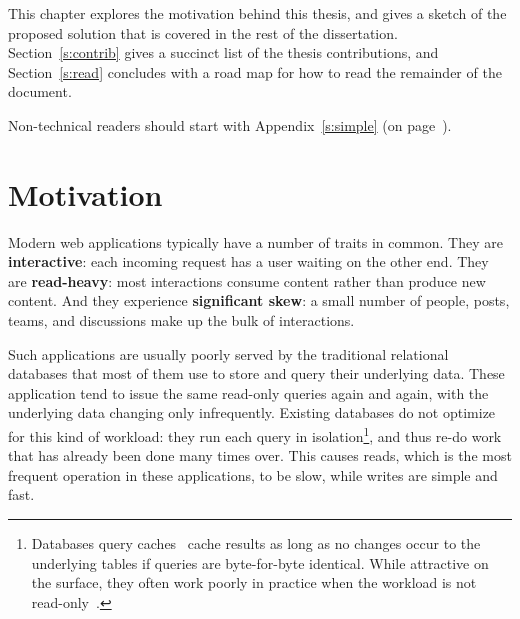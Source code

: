 This chapter explores the motivation behind this thesis, and gives a sketch of
the proposed solution that is covered in the rest of the dissertation.
Section~\ref{s:contrib} gives a succinct list of the thesis contributions, and
Section~\ref{s:read} concludes with a road map for how to read the remainder of
the document.

Non-technical readers should start with Appendix~\ref{s:simple} (on
page~\pageref{s:simple}).

\section{Motivation}

Modern web applications typically have a number of traits in common. They are
\textbf{interactive}: each incoming request has a user waiting on the other end.
They are \textbf{read-heavy}: most interactions consume content rather than
produce new content. And they experience \textbf{significant skew}: a small
number of people, posts, teams, and discussions make up the bulk of
interactions.

Such applications are usually poorly served by the traditional relational
databases that most of them use to store and query their underlying data. These
application tend to issue the same read-only queries again and again, with the
underlying data changing only infrequently. Existing databases do not optimize
for this kind of workload: they run each query in isolation\footnote{
Databases query caches~\cite{mysql-query-cache,pgpool-query-cache} cache results
as long as no changes occur to the underlying tables if queries are
byte-for-byte identical. While attractive on the surface, they often work poorly
in practice when the workload is not
read-only~\cite{mysql-query-cache-nope,pgpool-query-cache}.}, and thus re-do
work that has already been done many times over. This causes reads, which is the
most frequent operation in these applications, to be slow, while writes are
simple and fast.

